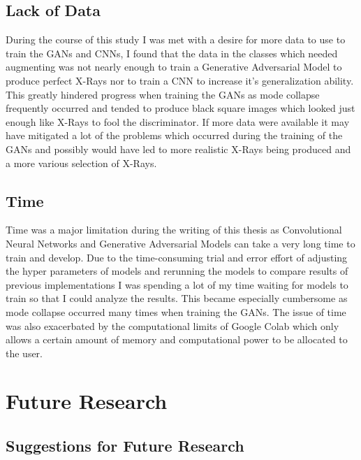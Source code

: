 \subsection{Lack of Data}
During the course of this study I was met with a desire for more data to use to train the GANs and CNNs, I found that the data in the classes which needed augmenting was not nearly enough to train a Generative Adversarial Model to produce perfect X-Rays nor to train a CNN to increase it's generalization ability.  This greatly hindered progress when training the GANs as mode collapse frequently occurred and tended to produce black square images which looked just enough like X-Rays to fool the discriminator.  If more data were available it may have mitigated a lot of the problems which occurred during the training of the GANs and possibly would have led to more realistic X-Rays being produced and a more various selection of X-Rays.  
\subsection{Time}
Time was a major limitation during the writing of this thesis as Convolutional Neural Networks and Generative Adversarial Models can take a very long time to train and develop.  Due to the time-consuming trial and error effort of adjusting the hyper parameters of models and rerunning the models to compare results of previous implementations I was spending a lot of my time waiting for models to train so that I could analyze the results.  This became especially cumbersome as mode collapse occurred many times when training the GANs.  The issue of time was also exacerbated by the computational limits of Google Colab which only allows a certain amount of memory and computational power to be allocated to the user. 
\section{Future Research}
\subsection{Suggestions for Future Research}
